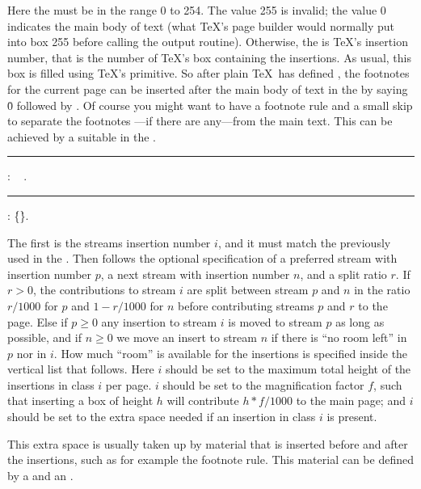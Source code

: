 Here  the  must be in the range 0 to 254. The value 255 is invalid;
the value 0 indicates the main body of text (what \TeX's page builder would normally put into
box 255 before calling the output routine).
Otherwise, the  is \TeX's insertion number, that is the number of \TeX's box 
containing the insertions. As usual, this box is filled using \TeX's  primitive. 
So after plain \TeX\ has defined ,
the footnotes for the current page can be inserted after the main body of text in the 
by saying \.0 followed by .
Of course you might want to have a footnote rule and a small skip to separate the 
footnotes ---if there are any---from the main text. This can be achieved by a suitable
 in the .

\medskip
\rule{}:
  \OR\  .
\rule{}:
     \opt{\.{=}}
 \.{\{}\.{\}}.
\medskip


The first  is the streams insertion number $i$,
and it must match the  
previously used in the .
Then follows the optional specification of a preferred stream with insertion number $p$,
a next stream with insertion number $n$, and a split ratio $r$.
If $r>0$, the contributions to stream $i$ are split between
stream $p$ and $n$  in the ratio $r/1000$ for $p$ and $1-r/1000$ for $n$
before contributing streams $p$ and $r$ to the page.
Else if $p\ge0$ any insertion to stream $i$ is moved to stream $p$ as long as possible,
and if $n\ge0$ we move an insert to stream $n$ if there is ``no room left'' in $p$ nor in $i$.
How much ``room'' is available for the insertions is specified inside the vertical list
that follows.
Here $i$ should be set to the maximum total height of the insertions in class $i$ per page. 
$i$ should be set to the magnification factor $f$,
such that inserting a box of height $h$ will contribute $h*f/1000$ to the main page;
and $i$ should be set to the extra space needed if an insertion in class $i$ is present.

This extra space is usually taken up by material that is inserted before and after the insertions,
such as for example the footnote rule. This material can be defined by a 
 and an .

